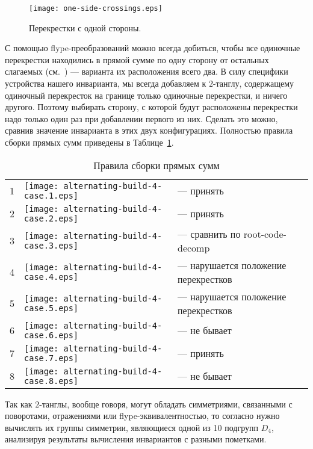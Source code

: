 		\begin{figure}[ht]
			\centering
			\texttt{[image: one-side-crossings.eps]}
			\caption{Перекрестки с одной стороны.\label{figure:one-side-crossings}}
		\end{figure}

		С помощью flype-преобразований можно всегда добиться, чтобы все одиночные перекрестки находились в прямой сумме по одну сторону
		от остальных слагаемых (см.~) --- варианта их расположения всего два. В силу специфики
		устройства нашего инварианта, мы всегда добавляем к $2$-танглу, содержащему одиночный перекресток на границе только одиночные
		перекрестки, и ничего другого. Поэтому выбирать сторону, с которой будут расположены перекрестки надо только один раз при
		добавлении первого из них. Сделать это можно, сравнив значение инварианта в этих двух конфигурациях. Полностью правила
		сборки прямых сумм приведены в Таблице~\ref{table:sums-rules}.

		\begin{table}[ht]
			\caption{Правила сборки прямых сумм\label{table:sums-rules}}
			\centering
			\begin{tabular}{cm{22mm}l}
				\hline
				1 & \texttt{[image: alternating-build-4-case.1.eps]} & --- принять \\
				2 & \texttt{[image: alternating-build-4-case.2.eps]} & --- принять \\
				3 & \texttt{[image: alternating-build-4-case.3.eps]} & --- сравнить по root-code-decomp \\
				4 & \texttt{[image: alternating-build-4-case.4.eps]} & --- нарушается положение перекрестков \\
				5 & \texttt{[image: alternating-build-4-case.5.eps]} & --- нарушается положение перекрестков \\
				6 & \texttt{[image: alternating-build-4-case.6.eps]} & --- не бывает \\
				7 & \texttt{[image: alternating-build-4-case.7.eps]} & --- принять \\
				8 & \texttt{[image: alternating-build-4-case.8.eps]} & --- не бывает \\
				\hline
			\end{tabular}
		\end{table}

		Так как $2$-танглы, вообще говоря, могут обладать симметриями, связанными с поворотами, отражениями или flype-эквивалентностью,
		то согласно  нужно вычислять их группы симметрии, являющиеся одной из 10 подгрупп $D_4$, анализируя
		результаты вычисления инвариантов с разными пометками.

